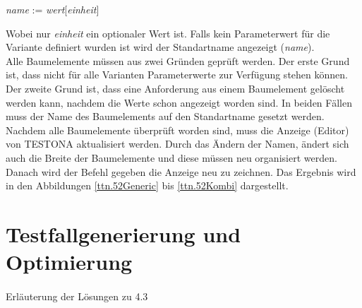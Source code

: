 \begin{center}
\textit{name} := \textit{wert}[\textit{einheit}]
\end{center}

Wobei nur \textit{einheit} ein optionaler Wert ist. Falls kein Parameterwert für die Variante definiert wurden ist wird der Standartname angezeigt (\textit{name}).\\

Alle Baumelemente müssen aus zwei Gründen geprüft werden. Der erste Grund ist, dass nicht für alle Varianten Parameterwerte zur Verfügung stehen können. Der zweite Grund ist, dass eine Anforderung aus einem Baumelement gelöscht werden kann, nachdem die Werte schon angezeigt worden sind. In beiden Fällen muss der Name des Baumelements auf den Standartname gesetzt werden.\\


Nachdem alle Baumelemente überprüft worden sind, muss die Anzeige (Editor) von TESTONA aktualisiert werden. Durch das Ändern der Namen, ändert sich auch die Breite der Baumelemente und diese müssen neu organisiert werden. Danach wird der Befehl gegeben die Anzeige neu zu zeichnen. Das Ergebnis wird in den Abbildungen \ref{ttn.52Generic} bis \ref{ttn.52Kombi} dargestellt.



\newpage
\section{Testfallgenerierung und Optimierung}
\paragraph{}
Erläuterung der Lösungen zu 4.3